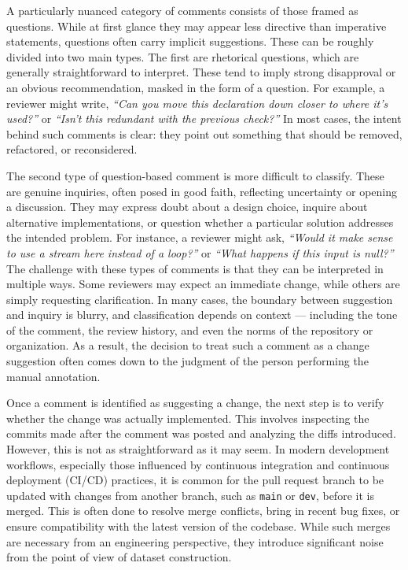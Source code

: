 A particularly nuanced category of comments consists of those framed as questions. While at first
glance they may appear less directive than imperative statements, questions often carry implicit
suggestions. These can be roughly divided into two main types. The first are rhetorical questions,
which are generally straightforward to interpret. These tend to imply strong disapproval or an
obvious recommendation, masked in the form of a question. For example, a reviewer might write,
\textit{``Can you move this declaration down closer to where it's used?''} or \textit{``Isn't this
redundant with the previous check?''} In most cases, the intent behind such comments is clear: they
point out something that should be removed, refactored, or reconsidered.

The second type of question-based comment is more difficult to classify. These are genuine
inquiries, often posed in good faith, reflecting uncertainty or opening a discussion. They may
express doubt about a design choice, inquire about alternative implementations, or question whether
a particular solution addresses the intended problem. For instance, a reviewer might ask,
\textit{“Would it make sense to use a stream here instead of a loop?”} or \textit{“What happens if
this input is null?”} The challenge with these types of comments is that they can be interpreted in
multiple ways. Some reviewers may expect an immediate change, while others are simply requesting
clarification. In many cases, the boundary between suggestion and inquiry is blurry, and
classification depends on context — including the tone of the comment, the review history, and even
the norms of the repository or organization. As a result, the decision to treat such a comment as a
change suggestion often comes down to the judgment of the person performing the manual annotation.

Once a comment is identified as suggesting a change, the next step is to verify whether the change
was actually implemented. This involves inspecting the commits made after the comment was posted and
analyzing the diffs introduced. However, this is not as straightforward as it may seem. In modern
development workflows, especially those influenced by continuous integration and continuous
deployment (CI/CD) practices, it is common for the pull request branch to be updated with changes
from another branch, such as \texttt{main} or \texttt{dev}, before it is merged. This is often done
to resolve merge conflicts, bring in recent bug fixes, or ensure compatibility with the latest
version of the codebase. While such merges are necessary from an engineering perspective, they
introduce significant noise from the point of view of dataset construction.

